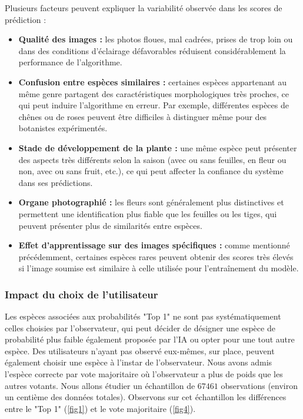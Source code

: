 \documentclass[a4paper,12pt]{article}
\begin{document}
Plusieurs facteurs peuvent expliquer la variabilité observée dans les scores de prédiction : 
\begin{itemize}
    \item \textbf{Qualité des images :} les photos floues, mal cadrées, prises de trop loin ou dans des conditions d'éclairage défavorables réduisent considérablement la performance de l'algorithme.
    \item \textbf{Confusion entre espèces similaires :} certaines espèces appartenant au même genre partagent des caractéristiques morphologiques très proches, ce qui peut induire l'algorithme en erreur. Par exemple, différentes espèces de chênes ou de roses peuvent être difficiles à distinguer même pour des botanistes expérimentés.
    \item \textbf{Stade de développement de la plante :} une même espèce peut présenter des aspects très différents selon la saison (avec ou sans feuilles, en fleur ou non, avec ou sans fruit, etc.), ce qui peut affecter la confiance du système dans ses prédictions.
    \item \textbf{Organe photographié :} les fleurs sont généralement plus distinctives et permettent une identification plus fiable que les feuilles ou les tiges, qui peuvent présenter plus de similarités entre espèces.
    \item \textbf{Effet d'apprentissage sur des images spécifiques :} comme mentionné précédemment, certaines espèces rares peuvent obtenir des scores très élevés si l'image soumise est similaire à celle utilisée pour l'entraînement du modèle.
\end{itemize}

\subsubsection{Impact du choix de l'utilisateur}

Les espèces associées aux probabilités "Top 1" ne sont pas systématiquement celles choisies par l'observateur, qui peut décider de désigner une espèce de probabilité plus faible également proposée par l'IA ou opter pour une tout autre espèce. Des utilisateurs n'ayant pas observé eux-mêmes, sur place, peuvent également choisir une espèce à l'instar de l'observateur. Nous avons admis l'espèce correcte par vote majoritaire où l'observateur a plus de poids que les autres votants. Nous allons étudier un échantillon de $\num{67 461}$ observations (environ un centième des données totales). Observons sur cet échantillon les différences entre le "Top 1" (\autoref{fig1}) et le vote majoritaire (\autoref{fig4}).
\end{document}
